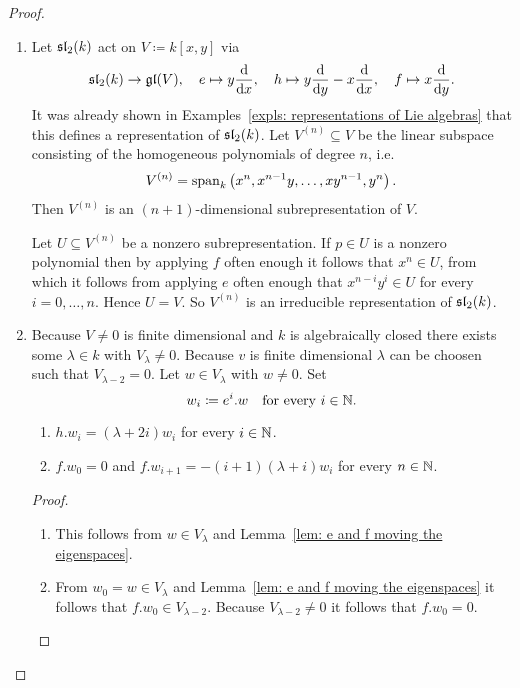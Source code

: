 \begin{proof}
 \begin{enumerate}[leftmargin=*]
  \item
   Let $\mathfrak{sl}_2(k)$ act on $V \coloneqq k[x,y]$ via
   \[
    \mathfrak{sl}_2(k) \to \mathfrak{gl}(V), \quad
    e \mapsto y\frac{\text{d}}{\text{d}x}, \quad
    h \mapsto y\frac{\text{d}}{\text{d}y}-x\frac{\text{d}}{\text{d}x}, \quad
    f \mapsto x\frac{\text{d}}{\text{d}y}.
   \]
   It was already shown in Examples~\ref{expls: representations of Lie algebras} that this defines a representation of $\mathfrak{sl}_2(k)$. Let $V^{(n)} \subseteq V$ be the linear subspace consisting of the homogeneous polynomials of degree $n$, i.e.\
   \[
    V^{(n)} = \operatorname{span}_k\left( x^n, x^{n-1} y, \dotsc, x y^{n-1}, y^n \right).
   \]
   Then $V^{(n)}$ is an $(n+1)$-dimensional subrepresentation of $V$.
   
   Let $U \subseteq V^{(n)}$ be a nonzero subrepresentation. If $p \in U$ is a nonzero polynomial then by applying $f$ often enough it follows that $x^n \in U$, from which it follows from applying $e$ often enough that $x^{n-i} y^i \in U$ for every $i = 0, \dotsc, n$. Hence $U = V$. So $V^{(n)}$ is an irreducible representation of $\mathfrak{sl}_2(k)$.
   
  \item
   Because $V \neq 0$ is finite dimensional and $k$ is algebraically closed there exists some $\lambda \in k$ with $V_\lambda \neq 0$. Because $v$ is finite dimensional $\lambda$ can be choosen such that $V_{\lambda-2} = 0$. Let $w \in V_\lambda$ with $w \neq 0$. Set
   \[
    w_i \coloneqq e^i.w \quad \text{for every $i \in \mathbb{N}$}.
   \]
   \begin{claim*}
    \begin{enumerate}[leftmargin=*]
     \item
      $h.w_i = (\lambda+2i) w_i$ for every $i \in \mathbb{N}$.
     \item
      $f.w_0 = 0$ and $f.w_{i+1} = -(i+1)(\lambda+i)w_i$ for every $n \in \mathbb{N}$.
    \end{enumerate}
   \end{claim*}
   \begin{proof}
    \begin{enumerate}[leftmargin=*]
     \item
      This follows from $w \in V_\lambda$ and Lemma~\ref{lem: e and f moving the eigenspaces}.
     \item
      From $w_0 = w \in V_\lambda$ and Lemma~\ref{lem: e and f moving the eigenspaces} it follows that $f.w_0 \in V_{\lambda-2}$. Because $V_{\lambda-2} \neq 0$ it follows that $f.w_0 = 0$.
      

\end{enumerate}
\end{proof}
\end{enumerate}
\end{proof}
